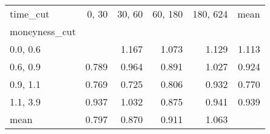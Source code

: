 \begin{tabular}{lrrrrr}
\toprule
time\_cut &  0, 30 &  30, 60 &  60, 180 &  180, 624 &  mean \\
moneyness\_cut &          &           &            &             &       \\
\midrule
0.0, 0.6    &          &     1.167 &      1.073 &       1.129 & 1.113 \\
0.6, 0.9    &    0.789 &     0.964 &      0.891 &       1.027 & 0.924 \\
0.9, 1.1    &    0.769 &     0.725 &      0.806 &       0.932 & 0.770 \\
1.1, 3.9    &    0.937 &     1.032 &      0.875 &       0.941 & 0.939 \\
mean          &    0.797 &     0.870 &      0.911 &       1.063 &       \\
\bottomrule
\end{tabular}
